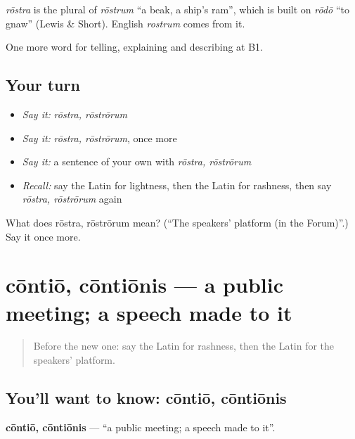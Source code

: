 \begin{cousinweb}
\emph{rōstra} is the plural of \emph{rōstrum} \textquotedblleft{}a beak, a ship's ram\textquotedblright{}, which is built on \emph{rōdō} \textquotedblleft{}to gnaw\textquotedblright{} (Lewis \& Short). English \emph{rostrum} comes from it.
\end{cousinweb}

\begin{grammarlens}[title={What you've built}]
One more word for telling, explaining and describing at B1.
\end{grammarlens}

\subsection*{Your turn}
\begin{itemize}
\raggedright
  \item \emph{Say it:} \emph{rōstra, rōstrōrum}
  \item \emph{Say it:} \emph{rōstra, rōstrōrum}, once more
  \item \emph{Say it:} a sentence of your own with \emph{rōstra, rōstrōrum}
  \item \emph{Recall:} say the Latin for lightness, then the Latin for rashness, then say \emph{rōstra, rōstrōrum} again
\end{itemize}

\begin{tcolorbox}[breakable,colback=teal!4,colframe=teal!35!black,title={Before you move on}]
What does rōstra, rōstrōrum mean? (\textquotedblleft{}The speakers' platform (in the Forum)\textquotedblright{}.) Say it once more.
\end{tcolorbox}
\section[cōntiō, cōntiōnis]{cōntiō, cōntiōnis — a public meeting; a speech made to it}

\label{lesson:LA-C371-contio}



\begin{quote}
Before the new one: say the Latin for rashness, then the Latin for the speakers' platform.
\end{quote}

\subsection*{You'll want to know: cōntiō, cōntiōnis}
\textbf{cōntiō, cōntiōnis} — \textquotedblleft{}a public meeting; a speech made to it\textquotedblright{}.

